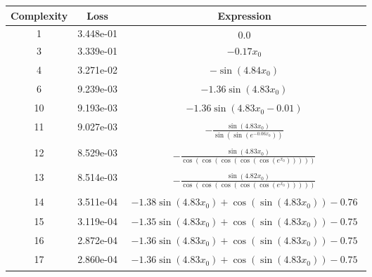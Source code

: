 \begin{center}
        \begin{tabular}{|c|c|c|}
        \hline
        Complexity & Loss & Expression \\
        \hline
        1 & 3.448e-01 & $\begin{aligned}0.0\end{aligned}$\\ \hline3 & 3.339e-01 & $\begin{aligned}- 0.17 x_{0}\end{aligned}$\\ \hline4 & 3.271e-02 & $\begin{aligned}- \sin{\left(4.84 x_{0} \right)}\end{aligned}$\\ \hline6 & 9.239e-03 & $\begin{aligned}- 1.36 \sin{\left(4.83 x_{0} \right)}\end{aligned}$\\ \hline10 & 9.193e-03 & $\begin{aligned}- 1.36 \sin{\left(4.83 x_{0} - 0.01 \right)}\end{aligned}$\\ \hline11 & 9.027e-03 & $\begin{aligned}- \frac{\sin{\left(4.83 x_{0} \right)}}{\sin{\left(\sin{\left(e^{- 0.06 x_{0}} \right)} \right)}}\end{aligned}$\\ \hline12 & 8.529e-03 & $\begin{aligned}- \frac{\sin{\left(4.83 x_{0} \right)}}{\cos{\left(\cos{\left(\cos{\left(\cos{\left(\cos{\left(e^{x_{0}} \right)} \right)} \right)} \right)} \right)}}\end{aligned}$\\ \hline13 & 8.514e-03 & $\begin{aligned}- \frac{\sin{\left(4.82 x_{0} \right)}}{\cos{\left(\cos{\left(\cos{\left(\cos{\left(\cos{\left(e^{x_{0}} \right)} \right)} \right)} \right)} \right)}}\end{aligned}$\\ \hline14 & 3.511e-04 & $\begin{aligned}- 1.38 \sin{\left(4.83 x_{0} \right)} + \cos{\left(\sin{\left(4.83 x_{0} \right)} \right)} - 0.76\end{aligned}$\\ \hline15 & 3.119e-04 & $\begin{aligned}- 1.35 \sin{\left(4.83 x_{0} \right)} + \cos{\left(\sin{\left(4.83 x_{0} \right)} \right)} - 0.75\end{aligned}$\\ \hline16 & 2.872e-04 & $\begin{aligned}- 1.36 \sin{\left(4.83 x_{0} \right)} + \cos{\left(\sin{\left(4.83 x_{0} \right)} \right)} - 0.75\end{aligned}$\\ \hline17 & 2.860e-04 & $\begin{aligned}- 1.36 \sin{\left(4.83 x_{0} \right)} + \cos{\left(\sin{\left(4.83 x_{0} \right)} \right)} - 0.75\end{aligned}$\\ 
\end{tabular}
\end{center}
